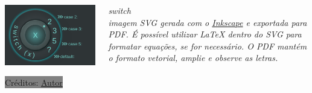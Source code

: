 \documentclass[aspectratio=169]{beamer}
\begin{document}
\begin{frame}[t]\frametitle{\secname}\framesubtitle{\subsecname}
  \begin{columns}[T]
    \begin{column}{9.75cm}
      \includegraphics[width=\columnwidth]{images/pdf/switch.pdf}%
      \par\vspace*{-1.8\baselineskip}\hfill{}\colorbox{gray}{\footnotesize\color{white}Créditos: \href{https://github.com/roger-willian}{Autor}}
    \end{column}
    \begin{column}{4.25cm}
      \it\alert{switch}\\
      imagem SVG gerada com o \href{https://inkscape.org/}{Inkscape} e exportada para PDF.
      É possível utilizar \LaTeX{} dentro do SVG para formatar equações, se for necessário.
      O PDF mantém o formato vetorial, amplie e observe as letras.
    \end{column}
  \end{columns}
\end{frame}
\end{document}
